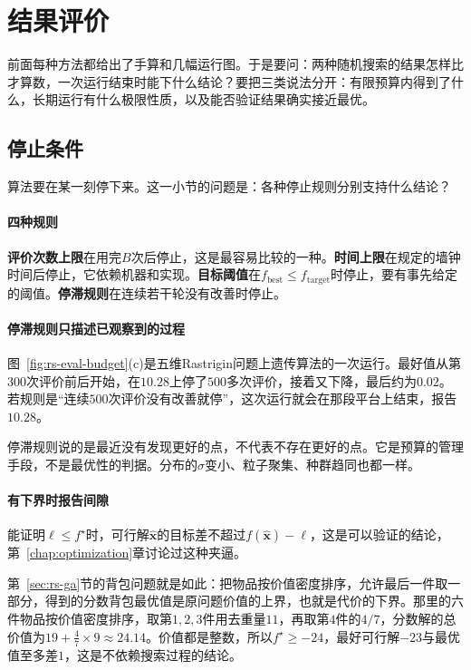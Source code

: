 \section{结果评价}
\label{sec:rs-evaluation}

前面每种方法都给出了手算和几幅运行图。于是要问：两种随机搜索的结果怎样比才算数，一次运行结束时能下什么结论？要把三类说法分开：有限预算内得到了什么，长期运行有什么极限性质，以及能否验证结果确实接近最优。

\subsection{停止条件}
\label{sec:rs-eval-stop}

算法要在某一刻停下来。这一小节的问题是：各种停止规则分别支持什么结论？

\paragraph{四种规则}
\textbf{评价次数上限}在用完$B$次后停止，这是最容易比较的一种。\textbf{时间上限}在规定的墙钟时间后停止，它依赖机器和实现。\textbf{目标阈值}在$f_{\mathrm{best}}\leq f_{\mathrm{target}}$时停止，要有事先给定的阈值。\textbf{停滞规则}在连续若干轮没有改善时停止。

\paragraph{停滞规则只描述已观察到的过程}
图~\ref{fig:rs-eval-budget}(c)是五维Rastrigin问题上遗传算法的一次运行。最好值从第$300$次评价前后开始，在$10.28$上停了$500$多次评价，接着又下降，最后约为$0.02$。若规则是“连续$500$次评价没有改善就停”，这次运行就会在那段平台上结束，报告$10.28$。

停滞规则说的是最近没有发现更好的点，不代表不存在更好的点。它是预算的管理手段，不是最优性的判据。分布的$\sigma$变小、粒子聚集、种群趋同也都一样。

\paragraph{有下界时报告间隙}
能证明$\ell\leq f^\star$时，可行解$\hat{\bm{x}}$的目标差不超过$f(\hat{\bm{x}})-\ell$，这是可以验证的结论，第~\ref{chap:optimization}章讨论过这种夹逼。

第~\ref{sec:rs-ga}节的背包问题就是如此：把物品按价值密度排序，允许最后一件取一部分，得到的分数背包最优值是原问题价值的上界，也就是代价的下界。那里的六件物品按价值密度排序，取第$1,2,3$件用去重量$11$，再取第$4$件的$4/7$，分数解的总价值为$19+\tfrac47\times9\approx24.14$。价值都是整数，所以$f^\star\geq-24$，最好可行解$-23$与最优值至多差$1$，这是不依赖搜索过程的结论。

